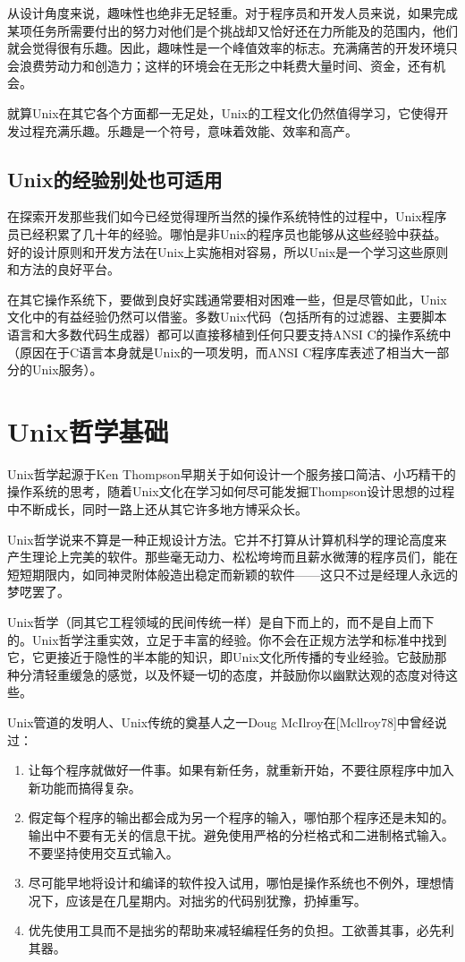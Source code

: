 \documentclass[12pt,oneside]{book}
\begin{document}
\begin{common-format}
从设计角度来说，趣味性也绝非无足轻重。对于程序员和开发人员来说，如果完成某项任务所需要付出的努力对他们是个挑战却又恰好还在力所能及的范围内，他们就会觉得很有乐趣。因此，趣味性是一个峰值效率的标志。充满痛苦的开发环境只会浪费劳动力和创造力；这样的环境会在无形之中耗费大量时间、资金，还有机会。

就算Unix在其它各个方面都一无足处，Unix的工程文化仍然值得学习，它使得开发过程充满乐趣。乐趣是一个符号，意味着效能、效率和高产。

\subsection{Unix的经验别处也可适用}
在探索开发那些我们如今已经觉得理所当然的操作系统特性的过程中，Unix程序员已经积累了几十年的经验。哪怕是非Unix的程序员也能够从这些经验中获益。好的设计原则和开发方法在Unix上实施相对容易，所以Unix是一个学习这些原则和方法的良好平台。

在其它操作系统下，要做到良好实践通常要相对困难一些，但是尽管如此，Unix文化中的有益经验仍然可以借鉴。多数Unix代码（包括所有的过滤器、主要脚本语言和大多数代码生成器）都可以直接移植到任何只要支持ANSI C的操作系统中（原因在于C语言本身就是Unix的一项发明，而ANSI C程序库表述了相当大一部分的Unix服务）。


\section{Unix哲学基础}
Unix哲学起源于Ken Thompson早期关于如何设计一个服务接口简洁、小巧精干的操作系统的思考，随着Unix文化在学习如何尽可能发掘Thompson设计思想的过程中不断成长，同时一路上还从其它许多地方博采众长。

Unix哲学说来不算是一种正规设计方法。它并不打算从计算机科学的理论高度来产生理论上完美的软件。那些毫无动力、松松垮垮而且薪水微薄的程序员们，能在短短期限内，如同神灵附体般造出稳定而新颖的软件——这只不过是经理人永远的梦呓罢了。
    
Unix哲学（同其它工程领域的民间传统一样）是自下而上的，而不是自上而下的。Unix哲学注重实效，立足于丰富的经验。你不会在正规方法学和标准中找到它，它更接近于隐性的半本能的知识，即Unix文化所传播的专业经验。它鼓励那种分清轻重缓急的感觉，以及怀疑一切的态度，并鼓励你以幽默达观的态度对待这些。
   
Unix管道的发明人、Unix传统的奠基人之一Doug McIlroy在[Mcllroy78]中曾经说过：
\begin{enumerate}
\renewcommand{\labelenumi}{（\roman{enumi}）}
\item 让每个程序就做好一件事。如果有新任务，就重新开始，不要往原程序中加入新功能而搞得复杂。
\item 假定每个程序的输出都会成为另一个程序的输入，哪怕那个程序还是未知的。输出中不要有无关的信息干扰。避免使用严格的分栏格式和二进制格式输入。不要坚持使用交互式输入。
\item 尽可能早地将设计和编译的软件投入试用，哪怕是操作系统也不例外，理想情况下，应该是在几星期内。对拙劣的代码别犹豫，扔掉重写。
\item 优先使用工具而不是拙劣的帮助来减轻编程任务的负担。工欲善其事，必先利其器。
\end{enumerate}


\end{common-format}
\end{document}
